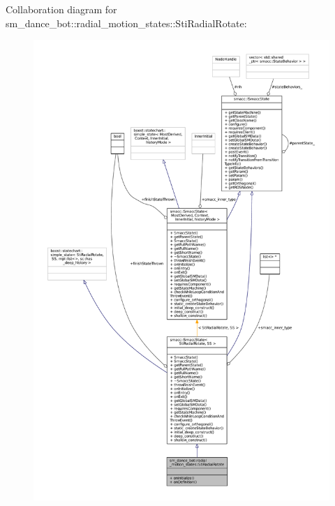 Collaboration diagram for sm\+\_\+dance\+\_\+bot\+:\+:radial\+\_\+motion\+\_\+states\+:\+:Sti\+Radial\+Rotate\+:
\nopagebreak
\begin{figure}[H]
\begin{center}
\leavevmode
\includegraphics[width=350pt]{structsm__dance__bot_1_1radial__motion__states_1_1StiRadialRotate__coll__graph}
\end{center}
\end{figure}
